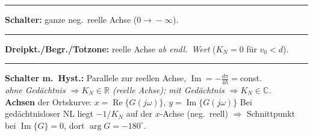 \bereichende


\noindent
\begin{minipage}[c]{0.45\linewidth}\centering
{}
\end{minipage}\hfill
\begin{minipage}[c]{0.53\linewidth}\footnotesize
{\color{red!75!black}\rule{9pt}{2.4pt}}\; \textbf{Schalter:} ganze neg.\ reelle Achse ($0\!\to\!-\infty$).\\[0.25em]
{\color{orange!85!black}\rule{9pt}{2.4pt}}\; \textbf{Dreipkt./Begr./Totzone:} reelle Achse \emph{ab endl.\ Wert} ($K_N{=}0$ für $v_0{<}d$).\\[0.25em]
{\color{blue!70!black}\rule{9pt}{2.4pt}}\; \textbf{Schalter m.\ Hyst.:} Parallele zur reellen Achse, $\operatorname{Im}{=}-\tfrac{d\pi}{4h}{=}$const.\\[0.25em]
\textit{ohne Gedächtnis $\Rightarrow K_N\in\mathbb{R}$ (reelle Achse); mit Gedächtnis $\Rightarrow K_N\in\mathbb{C}$.}\\[0.25em]
\textbf{Achsen} der Ortskurve: $x{=}\operatorname{Re}\{G(j\omega)\}$, $y{=}\operatorname{Im}\{G(j\omega)\}$ Bei gedächtnisloser NL liegt $-1/K_N$ auf der $x$-Achse (neg.\ reell) $\Rightarrow$ Schnittpunkt bei $\operatorname{Im}\{G\}{=}0$, dort $\arg G{=}-180^\circ$.
\end{minipage}\par\vspace{0.2em}
\noindent\footnotesize\setlength{\tabcolsep}{2pt}%
